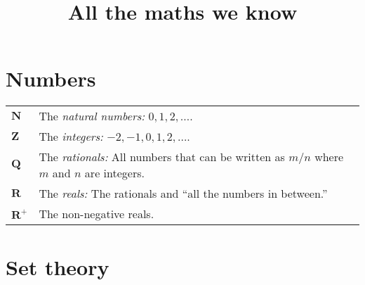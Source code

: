 \documentclass[10pt, a4paper, twocolumn]{article}
\title{All the maths we know}
\date{}
\author{}
\newcommand{\set}[1]{\mathbold{#1}}
\begin{document}
\maketitle
\section*{Numbers}
\begin{tabularx}{\columnwidth}{@{}p{}>{\raggedright\arraybackslash}X@{}}
  \toprule
  $\set{N}$ & The \emph{natural numbers:} $0, 1, 2, \dotsc$. \\
  $\set{Z}$ & The \emph{integers:} $-2, -1, 0, 1, 2, \dotsc$. \\
  $\set{Q}$ & The \emph{rationals:} All numbers that can be written
  as $m/n$ where $m$ and $n$ are integers. \\
  $\set{R}$ & The \emph{reals:} The rationals and ``all the numbers in
  between.'' \\
  $\set{R}^+$ & The non-negative reals. \\
\end{tabularx}

\section*{Set theory}
\end{document}
